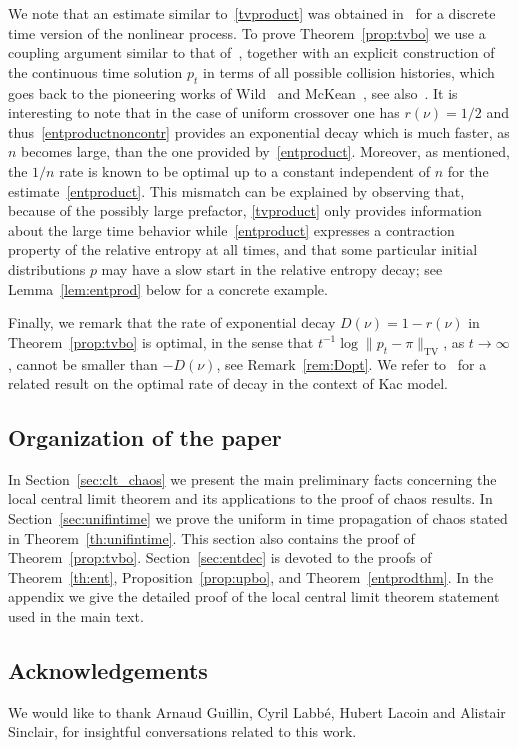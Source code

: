 \documentclass[AHL,Unicode,longabstracts,published]{cedram}
\newcommand{\tv}{\mathrm{TV}}
\begin{document}
We note that an estimate similar to~\eqref{tvproduct} was obtained in~\cite{Sinetal2} for a discrete time version of the nonlinear process. To prove Theorem~\ref{prop:tvbo} we use a coupling argument similar to that of~\cite{Sinetal2}, together with an explicit construction of the continuous time solution $p_t$ in terms of all possible collision histories, which goes back to the pioneering works of Wild~\cite{Wild} and McKean~\cite{mckean1966speed,mckean}, see also~\cite{carlenwild}. It is interesting to note that in the case of uniform crossover one has $r(\nu)=1/2$ and thus~\eqref{entproductnoncontr} provides an exponential decay which is much faster, as $n$ becomes large, than the one provided by~\eqref{entproduct}. Moreover, as mentioned, the $1/n$ rate is known to be optimal up to a constant independent of $n$ for the estimate~\eqref{entproduct}. This mismatch can be explained by observing that, because of the possibly large prefactor, \eqref{tvproduct} only provides information about the large time behavior while~\eqref{entproduct} expresses a contraction property of the relative entropy at all times, and that some particular initial distributions $p$ may have a slow start in the relative entropy decay; see Lemma~\ref{lem:entprod} below for a concrete example.

Finally, we remark that the rate of exponential decay $D(\nu)=1-r(\nu)$ in Theorem~\ref{prop:tvbo} is optimal, in the sense that $t^{-1}\log \|p_t-\pi\|_\tv$, as $t\to\infty$, cannot be smaller than $-D(\nu)$, see Remark~\ref{rem:Dopt}. We refer to~\cite{dolera_etal} for a related result on the optimal rate of decay in the context of Kac model.

\subsection{Organization of the paper}

In Section~\ref{sec:clt_chaos} we present the main preliminary facts concerning the local central limit theorem and its applications to the proof of chaos results. In Section~\ref{sec:unifintime} we prove the uniform in time propagation of chaos stated in Theorem~\ref{th:unifintime}. This section also contains the proof of Theorem~\ref{prop:tvbo}. Section~\ref{sec:entdec} is devoted to the proofs of Theorem~\ref{th:ent}, Proposition~\ref{prop:upbo}, and Theorem~\ref{entprodthm}. In the appendix we give the detailed proof of the local central limit theorem statement used in the main text.

\subsection*{Acknowledgements}
We would like to thank Arnaud Guillin, Cyril Labbé, Hubert Lacoin and Alistair Sinclair, for insightful conversations related to this work.
\end{document}
